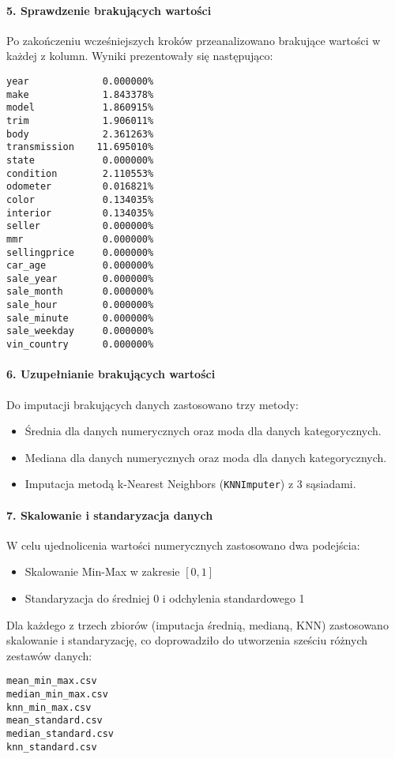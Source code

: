 \documentclass[10pt,letterpaper]{article}
\begin{document}
\paragraph{5. Sprawdzenie brakujących wartości}
Po zakończeniu wcześniejszych kroków przeanalizowano brakujące wartości w każdej z kolumn. Wyniki prezentowały się następująco:

\begin{verbatim}
year             0.000000%
make             1.843378%
model            1.860915%
trim             1.906011%
body             2.361263%
transmission    11.695010%
state            0.000000%
condition        2.110553%
odometer         0.016821%
color            0.134035%
interior         0.134035%
seller           0.000000%
mmr              0.000000%
sellingprice     0.000000%
car_age          0.000000%
sale_year        0.000000%
sale_month       0.000000%
sale_hour        0.000000%
sale_minute      0.000000%
sale_weekday     0.000000%
vin_country      0.000000%
\end{verbatim}

\paragraph{6. Uzupełnianie brakujących wartości}
Do imputacji brakujących danych zastosowano trzy metody:
\begin{itemize}
    \item Średnia dla danych numerycznych oraz moda dla danych kategorycznych.
    \item Mediana dla danych numerycznych oraz moda dla danych kategorycznych.
    \item Imputacja metodą k-Nearest Neighbors (\texttt{KNNImputer}) z 3 sąsiadami.
\end{itemize}

\paragraph{7. Skalowanie i standaryzacja danych}
W celu ujednolicenia wartości numerycznych zastosowano dwa podejścia:
\begin{itemize}
    \item Skalowanie Min-Max w zakresie $[0, 1]$
    \item Standaryzacja do średniej 0 i odchylenia standardowego 1
\end{itemize}
Dla każdego z trzech zbiorów (imputacja średnią, medianą, KNN) zastosowano skalowanie i standaryzację, co doprowadziło do utworzenia sześciu różnych zestawów danych:
\begin{verbatim}
mean_min_max.csv
median_min_max.csv
knn_min_max.csv
mean_standard.csv
median_standard.csv
knn_standard.csv
\end{verbatim}
\end{document}
